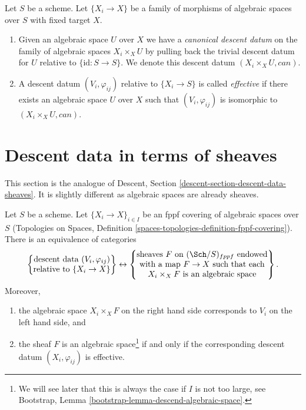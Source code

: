 \begin{definition}
\label{definition-effective-family}
Let $S$ be a scheme.
Let $\{X_i \to X\}$ be a family of morphisms of algebraic spaces over $S$
with fixed target $X$.
\begin{enumerate}
\item  Given an algebraic space $U$ over $X$
we have a {\it canonical descent datum} on the family of
algebraic spaces $X_i \times_X U$ by pulling back the trivial
descent datum for $U$ relative to $\{\text{id} : S \to S\}$.
We denote this descent datum $(X_i \times_X U, can)$.
\item A descent datum $(V_i, \varphi_{ij})$
relative to $\{X_i \to S\}$ is called {\it effective}
if there exists an algebraic space $U$ over $X$ such that
$(V_i, \varphi_{ij})$ is isomorphic to $(X_i \times_X U, can)$.
\end{enumerate}
\end{definition}






\section{Descent data in terms of sheaves}
\label{section-descent-data-sheaves}

\noindent
This section is the analogue of Descent, Section
\ref{descent-section-descent-data-sheaves}.
It is slightly different as algebraic spaces are already sheaves.

\begin{lemma}
\label{lemma-descent-data-sheaves}
Let $S$ be a scheme. Let $\{X_i \to X\}_{i \in I}$ be an fppf
covering of algebraic spaces over $S$ (Topologies on Spaces,
Definition \ref{spaces-topologies-definition-fppf-covering}).
There is an equivalence of categories
$$
\left\{
\begin{matrix}
\text{descent data }(V_i, \varphi_{ij})\\
\text{relative to }\{X_i \to X\}
\end{matrix}
\right\}
\leftrightarrow
\left\{
\begin{matrix}
\text{sheaves }F\text{ on }(\Sch/S)_{fppf}\text{ endowed}\\
\text{with a map }F \to X\text{ such that each}\\
X_i \times_X F\text{ is an algebraic space}
\end{matrix}
\right\}.
$$
Moreover,
\begin{enumerate}
\item the algebraic space $X_i \times_X F$ on the right hand side
corresponds to $V_i$ on the left hand side, and
\item the sheaf $F$ is an algebraic space\footnote{We will see
later that this is always the case if $I$ is not too large, see
Bootstrap, Lemma \ref{bootstrap-lemma-descend-algebraic-space}.}
if and only if the
corresponding descent datum $(X_i, \varphi_{ij})$ is effective.
\end{enumerate}
\end{lemma}

